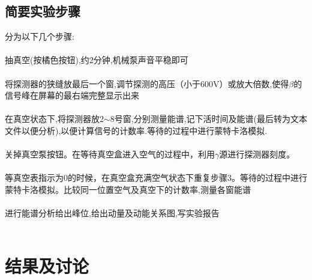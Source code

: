 \documentclass[a4paper]{article}
\begin{document}
\subsection{简要实验步骤}\label{sub:ExperimentalSteps}
分为以下几个步骤:\\\\
抽真空(按橘色按钮),约2分钟,机械泵声音平稳即可\\\\
将探测器的狭缝放最后一个窗,调节探测的高压（小于600V）或放大倍数,使得$\beta$的信号峰在屏幕的最右端完整显示出来\\\\
在真空状态下,将探测器放2$\sim$8号窗,分别测量能谱,记下活时间及能谱(最后转为文本文件以便分析),以便计算信号的计数率.等待的过程中进行蒙特卡洛模拟.\\\\
关掉真空泵按钮。在等待真空盒进入空气的过程中，利用$\gamma$源进行探测器刻度。\\\\
等真空表指示为0的时候，在真空盒充满空气状态下重复步骤3。等待的过程中进行蒙特卡洛模拟。比较同一位置空气及真空下的计数率,测量各窗能谱\\\\
进行能谱分析给出峰位,给出动量及动能关系图,写实验报告\\\\



\newpage
\section{结果及讨论}
\end{document}
